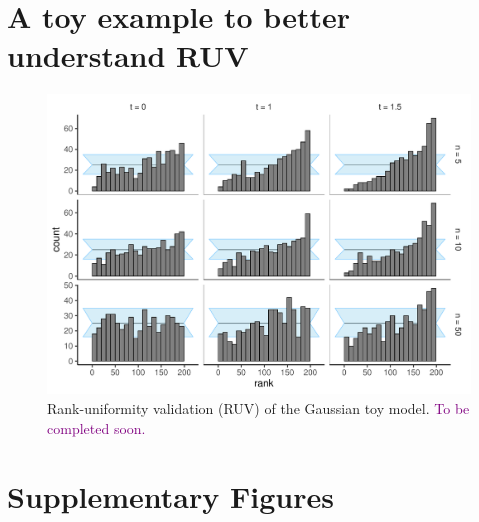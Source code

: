 \documentclass[oneside]{article}
\begin{document}


\section{A toy example to better understand  RUV}

\begin{figure}[!ht]
   \includegraphics[width=\linewidth]{../figures/sbc_normal.pdf}
  \caption{Rank-uniformity validation (RUV) of the Gaussian toy model. \textcolor{purple}{To be completed soon.}
   }
  \label{fig:ruv_normal_toy}
\end{figure}


\newpage
\section{Supplementary Figures}
\label{appendix::sec:supp_figures}
\end{document}

